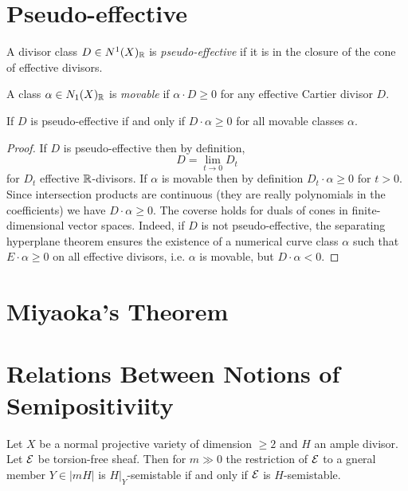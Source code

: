 \documentclass[12pt]{article}
\begin{document}
\section{Pseudo-effective}

\begin{defn}
A divisor class $D \in N^1(X)_{\mathbb{R}}$ is \textit{pseudo-effective} if it is in the closure of the cone of effective divisors. 
\end{defn}

\begin{defn}
A class $\alpha \in N_1(X)_{\mathbb{R}}$ is \textit{movable} if $\alpha \cdot D \ge 0$ for any effective Cartier divisor $D$.
\end{defn}

\begin{prop}
If $D$ is pseudo-effective if and only if $D \cdot \alpha \ge 0$ for all movable classes $\alpha$. 
\end{prop}

\begin{proof}
If $D$ is pseudo-effective then by definition,
\[ D = \lim_{t \to 0} D_t \]
for $D_t$ effective $\mathbb{R}$-divisors. If $\alpha$ is movable then by definition $D_t \cdot \alpha \ge 0$ for $t > 0$. Since intersection products are continuous (they are really polynomials in the coefficients) we have $D \cdot \alpha \ge 0$. The coverse holds for duals of cones in finite-dimensional vector spaces. Indeed, if $D$ is not pseudo-effective, the separating hyperplane theorem ensures the existence of a numerical curve class $\alpha$ such that $E \cdot \alpha \ge 0$ on all effective divisors, i.e. $\alpha$ is movable, but $D \cdot \alpha < 0$.
\end{proof}



\section{Miyaoka's Theorem}

\section{Relations Between Notions of Semipositiviity}

\begin{theorem}
Let $X$ be a normal projective variety of dimension $\ge 2$ and $H$ an ample divisor. Let $\mathcal{E}$ be torsion-free sheaf. Then for $m \gg 0$ the restriction of $\mathcal{E}$ to a gneral member $Y \in |mH|$ is $H|_Y$-semistable if and only if $\mathcal{E}$ is $H$-semistable.
\end{theorem}
\end{document}
